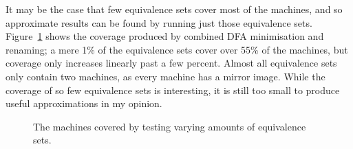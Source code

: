 It may be the case that few equivalence sets cover most of the machines,
and so approximate results can be found by running just those
equivalence sets. Figure~\ref{fig:coverage} shows the coverage produced by
combined DFA minimisation and renaming; a mere 1\% of the equivalence
sets cover over 55\% of the machines, but coverage only increases linearly
past a few percent. Almost all equivalence sets only contain two machines,
as every machine has a mirror image. While the coverage of so few equivalence
sets is interesting, it is still too small to produce useful approximations in
my opinion.

\begin{figure}
  \centering
  \caption{The machines covered by testing varying amounts of equivalence sets.}
  \label{fig:coverage}
\end{figure}